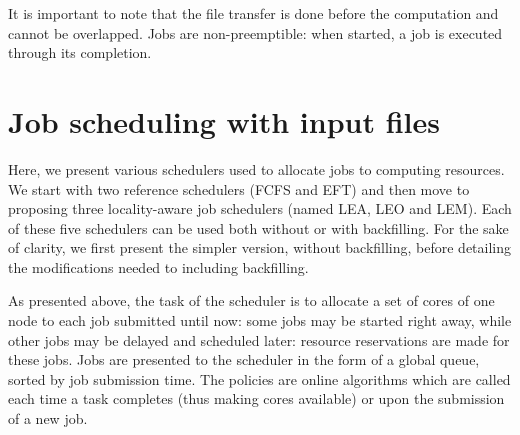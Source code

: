 \documentclass[conference,10pt]{IEEEtran}
\newcommand{\Node}[1]{\ensuremath{\mathrm{Node}_{#1}}\xspace}
\newcommand{\file}{\ensuremath{\mathit{File}}\xspace}
\newcommand{\size}{\ensuremath{\mathit{Size}}\xspace}
\newcommand{\bandwidth}{\mathit{BandWidth}\xspace}
\newcommand{\walltime}{\mathit{WallTime}\xspace}
\newcommand{\start}{\mathit{StartTime}\xspace}
\begin{document}
It is important to note that the file transfer is done before the computation and cannot be overlapped.
Jobs are non-preemptible: when started, a job is executed through its completion.


\section{Job scheduling with input files}\label{sec.schedulers}


Here, we present various schedulers used to allocate jobs to
computing resources. We start with two reference schedulers (FCFS and EFT)
and then move to proposing three locality-aware job schedulers (named
LEA, LEO and LEM). Each of these five schedulers can be used both
without or with backfilling. For the sake of clarity, we first present
the simpler version, without backfilling, before detailing the modifications needed to including backfilling.

As presented above, the task of the scheduler is to allocate a set of
cores of one node
to each job submitted until now: some jobs may be started right away,
while other jobs may be delayed and scheduled later: resource
reservations are made for these jobs. Jobs are presented to the
scheduler in the form of a global queue, sorted by job submission
time. The policies are online algorithms which are called each time
a task completes (thus making cores available) or upon the submission of
a new job.
\end{document}
